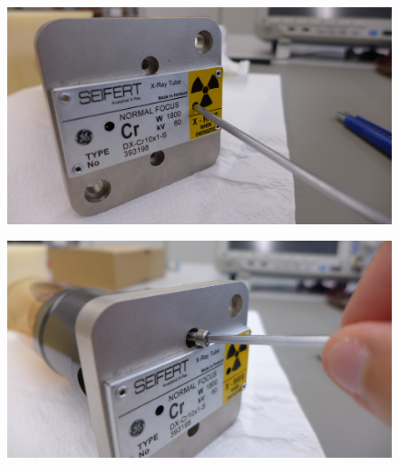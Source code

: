 \documentclass[a4paper,12pt,twoside]{article}
\begin{document}
\begin{appendices}
\begin{figure} [h!]
\centering
\begin{minipage}{.48\textwidth}
  \centering
  \includegraphics[width=\textwidth]{./screws1.png}
  \label{screws1}
\end{minipage}%
\hspace{2mm}
\begin{minipage}{.48\textwidth}
  \centering
  \includegraphics[width=\textwidth]{./screws2.png}
  \label{screws2}
\end{minipage}
\end{figure}


\end{appendices}
\end{document}
